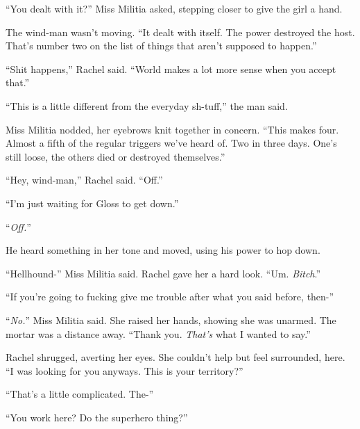 ``You dealt with it?''  Miss Militia asked, stepping closer to give the girl a hand.



The wind-man wasn't moving.  ``It dealt with itself.  The power destroyed the host.  That's number two on the list of things that aren't supposed to happen.''



``Shit happens,'' Rachel said.  ``World makes a lot more sense when you accept that.''



``This is a little different from the everyday sh-tuff,'' the man said.



Miss Militia nodded, her eyebrows knit together in concern.  ``This makes four.  Almost a fifth of the regular triggers we've heard of.  Two in three days.  One's still loose, the others died or destroyed themselves.''



``Hey, wind-man,'' Rachel said.  ``Off.''



``I'm just waiting for Gloss to get down.''



``\emph{Off.}''



He heard something in her tone and moved, using his power to hop down.



``Hellhound-'' Miss Militia said.  Rachel gave her a hard look.   ``Um.  \emph{Bitch}.''



``If you're going to fucking give me trouble after what you said before, then-''



``\emph{No.}''  Miss Militia said.  She raised her hands, showing she was unarmed.  The mortar was a distance away.  ``Thank you.  \emph{That's} what I wanted to say.''



Rachel shrugged, averting her eyes.  She couldn't help but feel surrounded, here.  ``I was looking for you anyways.  This is your territory?''



``That's a little complicated.  The-''



``You work here?  Do the superhero thing?''



